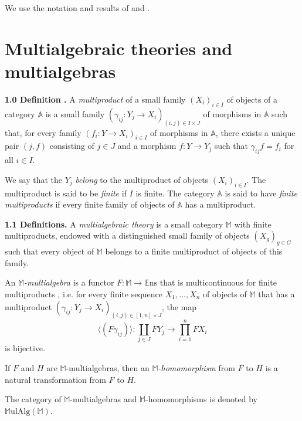 \documentclass{article}
\newenvironment{rmenv}[1]
  {\phantomsection\par\medskip\noindent\textbf{#1.}\rmfamily}
  {\medskip}
\newcommand{\bb}[1]{{\mathbb{#1}}}
\newcommand{\Set}{\mathbb{E}\mathrm{ns}}
\newcommand{\MulAlg}{\mathbb{M}\mathrm{ulAlg}}
\newcommand{\oldpage}[1]{\marginpar{\footnotesize$\Big\vert$ \textit{p.~#1}}}
\begin{document}
We use the notation and results of \cite{2} and \cite{3}.

\oldpage{194}
\section{Multialgebraic theories and multialgebras}

\begin{rmenv}{1.0 Definition \cite{2}}
\label{1.0}
  A \emph{multiproduct} of a small family $(X_i)_{i\in I}$ of objects of a category $\bb{A}$ is a small family $(\gamma_{ij}\colon Y_j\to X_i)_{(i,j)\in I\times J}$ of morphisms in $\bb{A}$ such that, for every family $(f_i\colon Y\to X_i)_{i\in I}$ of morphisms in $\bb{A}$, there exists a unique pair $(j,f)$ consisting of $j\in J$ and a morphism $f\colon Y\to Y_j$ such that $\gamma_{ij}f=f_i$ for all $i\in I$.

  We say that the $Y_j$ \emph{belong} to the multiproduct of objects $(X_i)_{i\in I}$.
  The multiproduct is said to be \emph{finite} if $I$ is finite.
  The category $\bb{A}$ is said to have \emph{finite multiproducts} if every finite family of objects of $\bb{A}$ has a multiproduct.
\end{rmenv}

\begin{rmenv}{1.1 Definitions}
\label{1.1}
  A \emph{multialgebraic theory} is a small category $\bb{M}$ with finite multiproducts, endowed with a distinguished small family of objects $(X_g)_{g\in G}$ such that every object of $\bb{M}$ belongs to a finite multiproduct of objects of this family.

  An \emph{$\bb{M}$-multialgebra} is a functor $F\colon\bb{M}\to\Set$ that is multicontinuous for finite multiproducts \cite{2}, i.e. for every finite sequence $X_1,\ldots,X_n$ of objects of $\bb{M}$ that has a multiproduct $(\gamma_{ij}\colon Y_j\to X_i)_{(i,j)\in[1,n]\times J}$, the map
  \[
    \langle(F\gamma_{ij})\rangle\colon
    \coprod_{j\in J} FY_j \to
    \prod_{i=1}^n FX_i
  \]
  is bijective.

  If $F$ and $H$ are $\bb{M}$-multialgebras, then an \emph{$\bb{M}$-homomorphism} from $F$ to $H$ is a natural transformation from $F$ to $H$.

  The category of $\bb{M}$-multialgebras and $\bb{M}$-homomorphisms is denoted by $\MulAlg(\bb{M})$.
\end{rmenv}
\end{document}
